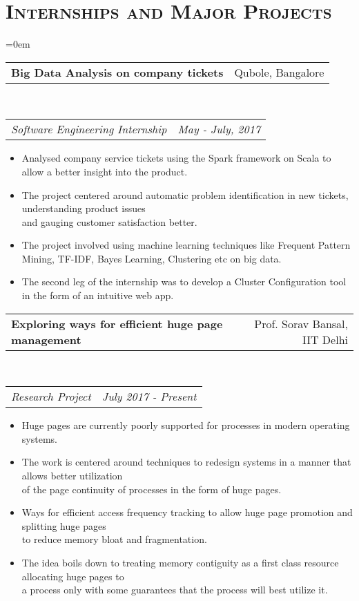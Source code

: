 \documentclass{article}
\makeatletter
\newcommand{\headerrow}[2]
{\begin{tabular*}{\linewidth}{l@{\extracolsep{\fill}}r}
	#1 &
	#2 \\
\end{tabular*}}
\newcommand{\tmpsection}[1]{}
\let\tmpsection=\section
\renewcommand{\section}[1]{\tmpsection*{\textsc{#1}}}
\makeatother
\begin{document}
\section{Internships and Major Projects}
\begin{list} {}{\leftmargin=0em}
\setlength{\leftmargin}{0pt}
\item[]
  \headerrow
    {\textbf{Big Data Analysis on company tickets}}
    {Qubole, Bangalore}
  \\
  \headerrow
    {\emph{Software Engineering Internship}}
    {\emph{May - July, 2017}}
      \begin{itemize}
        \item Analysed company service tickets using the Spark framework on Scala to allow a better insight into the product. 
        \item The project centered around automatic problem identification in new tickets, understanding product issues\\ and gauging customer satisfaction better.
        \item The project involved using machine learning techniques like Frequent Pattern Mining, TF-IDF, Bayes Learning, Clustering etc on big data.
        \item The second leg of the internship was to develop a Cluster Configuration tool in the form of an intuitive web app.
      \end{itemize}

\item[]
  \headerrow
    {\textbf{Exploring ways for efficient huge page management }}
    {Prof. Sorav Bansal, IIT Delhi}
  \\
  \headerrow
    {\emph{Research Project}}
    {\emph{July 2017 - Present}}
      \begin{itemize}
        \item Huge pages are currently poorly supported for processes in modern operating systems.
        \item The work is centered around techniques to redesign systems in a manner that allows better utilization\\ of the page continuity of processes in the form of huge pages.
        \item Ways for efficient access frequency tracking to allow huge page promotion and splitting huge pages\\ to reduce memory bloat and fragmentation.
        \item The idea boils down to treating memory contiguity as a first class resource allocating huge pages to\\ a process only with some guarantees that the process will best utilize it.
      \end{itemize}


\end{list}
\end{document}
